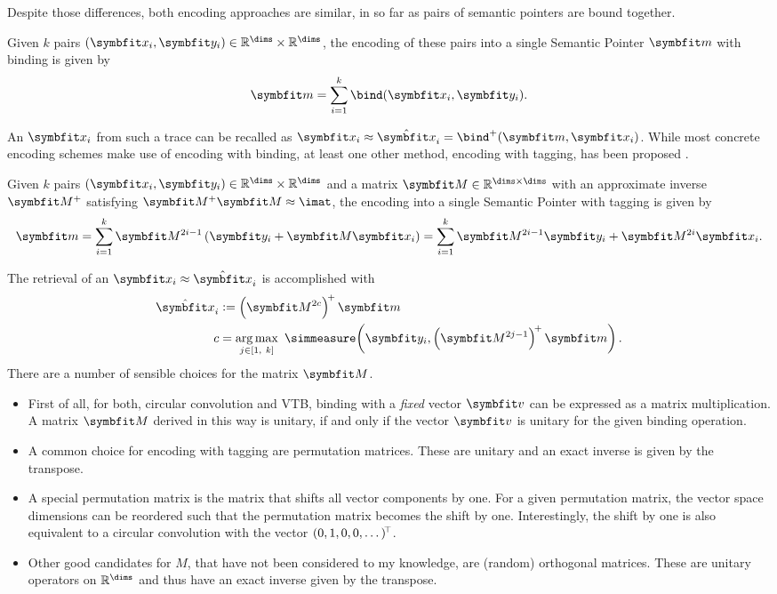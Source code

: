 Despite those differences, both encoding approaches are similar, in so far as pairs of semantic pointers are bound together.
\begin{defn}
    Given $k$ pairs $(\vc x_i, \vc y_i) \in \mathbb{R}^{\dims} \times \mathbb{R}^{\dims}$, the encoding of these pairs into a single Semantic Pointer $\vc m$ with binding is given by
    \begin{equation}
        \vc m = \sum_{i=1}^k \bind(\vc x_i, \vc y_i) \text{.}
    \end{equation}
\end{defn}
An $\vc x_i$ from such a trace can be recalled as $\vc x_i \approx \hat{\vc x}_i = \bind^+(\vc m, \vc x_i)$.
While most concrete encoding schemes make use of encoding with binding, at least one other method, encoding with tagging, has been proposed \parencite{recchia2015}.
\begin{defn}
    Given $k$ pairs $(\vc x_i, \vc y_i) \in \mathbb{R}^{\dims} \times \mathbb{R}^{\dims}$ and a matrix $\mat M \in \mathbb{R}^{\dims \times \dims}$ with an approximate inverse $\mat M^+$ satisfying $\mat M^+ \mat M \approx \imat$, the encoding into a single Semantic Pointer with tagging is given by
    \begin{equation}
        \vc m = \sum_{i=1}^k \mat M^{2i-1} \del{\vc y_i + \mat M \vc x_i} = \sum_{i=1}^k \mat M^{2i-1} \vc y_i + \mat M^{2i} \vc x_i \text{.}
    \end{equation}
\end{defn}
\noindent The retrieval of an $\vc x_i \approx \hat{\vc x}_i$ is accomplished with
\begin{align}
    \hat{\vc x}_i &:= \del{\mat M^{2c}}^{\!+} \vc m \\
    c &= \argmax_{j \in \sbr{1,\ k}}\ \simmeasure\!\del{\vc y_i, \del{\mat M^{2j-1}}^{\!+} \vc m} \text{.}
\end{align}
There are a number of sensible choices for the matrix $\mat M$.
\begin{itemize}
    \item First of all, for both, circular convolution and VTB, binding with a \emph{fixed} vector $\vc v$ can be expressed as a matrix multiplication.
        A matrix $\mat M$ derived in this way is unitary, if and only if the vector $\vc v$ is unitary for the given binding operation.
    \item A common choice for encoding with tagging are permutation matrices.
        These are unitary and an exact inverse is given by the transpose.
    \item A special permutation matrix is the matrix that shifts all vector components by one.
        For a given permutation matrix, the vector space dimensions can be reordered such that the permutation matrix becomes the shift by one.
        Interestingly, the shift by one is also equivalent to a circular convolution with the vector $(0, 1, 0, 0, \dotsc)\!^{\top}$.
    \item Other good candidates for $M$, that have not been considered to my knowledge, are (random) orthogonal matrices.
        These are unitary operators on $\mathbb{R}^{\dims}$ and thus have an exact inverse given by the transpose.
\end{itemize}
